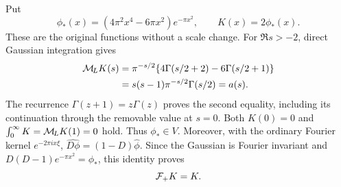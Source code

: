 Put
\begin{equation}\label{mburn:eq:kernel}
 \phi_*(x)=(4\pi^2x^4-6\pi x^2)e^{-\pi x^2},\qquad K(x)=2\phi_*(x).
\end{equation}
These are the original functions without a scale change. For
$\Re s>-2$, direct Gaussian integration gives
\begin{align}
 \mathcal M_{\!L} K(s)
 &=\pi^{-s/2}\{4\Gamma(s/2+2)-6\Gamma(s/2+1)\}\nonumber\\
 &=s(s-1)\pi^{-s/2}\Gamma(s/2)=a(s).\label{mburn:eq:MK}
\end{align}
The recurrence $\Gamma(z+1)=z\Gamma(z)$ proves the second equality,
including its continuation through the removable value at $s=0$.
Both $K(0)=0$ and $\int_0^\infty K=\mathcal M_{\!L} K(1)=0$ hold. Thus
$\phi_*\in V$. Moreover, with the ordinary Fourier kernel
$e^{-2\pi i x\xi}$, $\widehat{D\phi}=(1-D)\widehat\phi$.
Since the Gaussian is Fourier invariant and
$D(D-1)e^{-\pi x^2}=\phi_*$, this identity proves
\begin{equation}\label{mburn:eq:selfdual}
 \mathcal F_+ K=K.
\end{equation}

